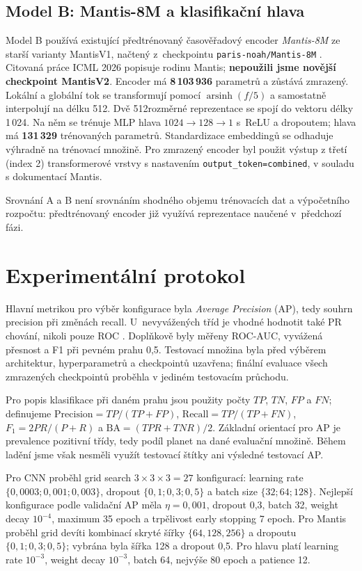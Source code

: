\documentclass[11pt,a4paper]{article}
\newcommand{\code}[1]{\texttt{#1}}
\begin{document}
\subsection{Model B: Mantis-8M a klasifikační hlava}
Model B používá existující předtrénovaný časověřadový encoder \emph{Mantis-8M} ze starší varianty MantisV1, načtený z~checkpointu \code{paris-noah/Mantis-8M} \cite{mantisoriginal,mantis2026,mantischeckpoint}. Citovaná práce ICML 2026 popisuje rodinu Mantis; \textbf{nepoužili jsme novější checkpoint MantisV2}. Encoder má \textbf{8\,103\,936} parametrů a zůstává zmrazený. Lokální a globální tok se transformují pomocí $\operatorname{arsinh}(f/5)$ a samostatně interpolují na délku 512. Dvě 512rozměrné reprezentace se spojí do vektoru délky 1\,024. Na něm se trénuje MLP hlava $1024\rightarrow128\rightarrow1$ s~ReLU a dropoutem; hlava má \textbf{131\,329} trénovaných parametrů. Standardizace embeddingů se odhaduje výhradně na trénovací množině. Pro zmrazený encoder byl použit výstup z třetí (index 2) transformerové vrstvy s nastavením \code{output\_token=combined}, v souladu s dokumentací Mantis.

Srovnání A a B není srovnáním shodného objemu trénovacích dat a výpočetního rozpočtu: předtrénovaný encoder již využívá reprezentace naučené v~předchozí fázi.

\section{Experimentální protokol}
Hlavní metrikou pro výběr konfigurace byla \emph{Average Precision} (AP), tedy souhrn precision při změnách recall. U~nevyvážených tříd je vhodné hodnotit také PR chování, nikoli pouze ROC \cite{saito2015}. Doplňkově byly měřeny ROC-AUC, vyvážená přesnost a F1 při pevném prahu 0,5. Testovací množina byla před výběrem architektur, hyperparametrů a checkpointů uzavřena; finální evaluace všech zmrazených checkpointů proběhla v jediném testovacím průchodu.

Pro popis klasifikace při daném prahu jsou použity počty $TP$, $TN$, $FP$ a $FN$; definujeme $\mathrm{Precision}=TP/(TP+FP)$, $\mathrm{Recall}=TP/(TP+FN)$, $F_1=2PR/(P+R)$ a $\mathrm{BA}=(TPR+TNR)/2$. Základní orientací pro AP je prevalence pozitivní třídy, tedy podíl planet na dané evaluační množině. Během ladění jsme však nesměli využít testovací štítky ani výsledné testovací AP.

Pro CNN proběhl grid search $3\times3\times3=27$ konfigurací: learning rate $\{0{,}0003;0{,}001;0{,}003\}$, dropout $\{0{,}1;0{,}3;0{,}5\}$ a batch size $\{32;64;128\}$. Nejlepší konfigurace podle validační AP měla $\eta=0{,}001$, dropout 0,3, batch 32, weight decay $10^{-4}$, maximum 35 epoch a trpělivost early stopping 7 epoch. Pro Mantis proběhl grid devíti kombinací skryté šířky $\{64,128,256\}$ a dropoutu $\{0{,}1;0{,}3;0{,}5\}$; vybrána byla šířka 128 a dropout 0,5. Pro hlavu platí learning rate $10^{-3}$, weight decay $10^{-3}$, batch 64, nejvýše 80 epoch a patience 12.
\end{document}

